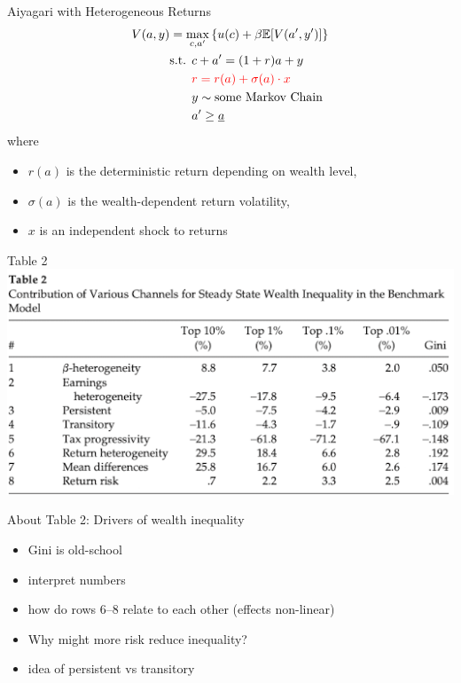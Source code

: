 \documentclass[aspectratio=169,mathserif]{beamer}
\begin{document}
\begin{frame}{Aiyagari with Heterogeneous Returns}
    \begin{align*}
    V(a, y) &= \max_{c, a'} \left\{ u(c) + \beta \mathbb{E}[V(a', y')] \right\} \\
    &\begin{aligned} \text{s.t. } & c + a' = (1 + r) a + y
        \\
        &\textcolor{red}{r = r(a) + \sigma(a) \cdot x} \\
        &y \sim \text{some Markov Chain} \\
        &a' \geq \underline{a}
    \end{aligned}
    \end{align*}
    where
    \begin{itemize}
        \item $r(a)$ is the deterministic return depending on wealth level,
        \item $\sigma(a)$ is the wealth-dependent return volatility,
        \item $x$ is an independent shock to returns
    \end{itemize}
\end{frame}

\begin{frame}{Table 2}
    \centering
    \includegraphics[scale = 0.7]{HKS_Tab_2.png}
\end{frame}

\begin{frame}{About Table 2: Drivers of wealth inequality}

    \begin{itemize}
        \item Gini is old-school
        \item interpret numbers
        \item how do rows 6--8 relate to each other (effects non-linear)
        \item Why might more risk reduce inequality?
        \item idea of persistent vs transitory
    \end{itemize}

\end{frame}
\end{document}
